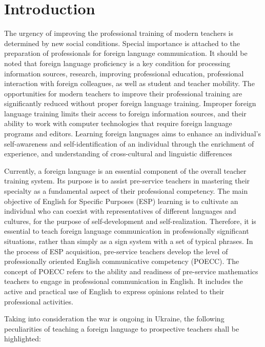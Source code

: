 \section{Introduction}\label{sec-introduction}

The urgency of improving the professional training of modern teachers is determined by new social conditions. Special importance is attached to the preparation of professionals for foreign language communication. It should be noted that foreign language proficiency is a key condition for processing information sources, research, improving professional education, professional interaction with foreign colleagues, as well as student and teacher mobility. The opportunities for modern teachers to improve their professional training are significantly reduced without proper foreign language training. Improper foreign language training limits their access to foreign information sources, and their ability to work with computer technologies that require foreign language programs and editors. Learning foreign languages aims to enhance an individual’s self-awareness and self-identification of an individual through the enrichment of experience, and understanding of cross-cultural and linguistic differences \cite{council2001common} %

Currently, a foreign language is an essential component of the overall teacher training system. Its purpose is to assist pre-service teachers in mastering their specialty as a fundamental aspect of their professional competency. The main objective of English for Specific Purposes (ESP) learning is to cultivate an individual who can coexist with representatives of different languages and cultures, for the purpose of self-development and self-realization. Therefore, it is essential to teach foreign language communication in professionally significant situations, rather than simply as a sign system with a set of typical phrases. In the process of ESP acquisition, pre-service teachers develop the level of professionally oriented English communicative competency (POECC). The concept of POECC refers to the ability and readiness of pre-service mathematics teachers to engage in professional communication in English. It includes the active and practical use of English to express opinions related to their professional activities.

Taking into consideration the war is ongoing in Ukraine, the following peculiarities of teaching a foreign language to prospective teachers shall be highlighted:

